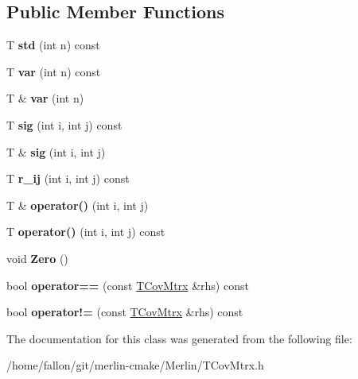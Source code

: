 \subsection*{Public Member Functions}
\begin{DoxyCompactItemize}
\item 
\mbox{\label{classTCovMtrx_ad3204c31a14b50cbf206a4240161e376}} 
T {\bfseries std} (int n) const
\item 
\mbox{\label{classTCovMtrx_a3162fcd988af288c9f18a07e52c3743c}} 
T {\bfseries var} (int n) const
\item 
\mbox{\label{classTCovMtrx_a8b238eeb634fb511693d7f4cda995edf}} 
T \& {\bfseries var} (int n)
\item 
\mbox{\label{classTCovMtrx_a44b617d9ba11fc1065b488c02a5dbfb1}} 
T {\bfseries sig} (int i, int j) const
\item 
\mbox{\label{classTCovMtrx_a432d924792148023a4935b919ef19f37}} 
T \& {\bfseries sig} (int i, int j)
\item 
\mbox{\label{classTCovMtrx_a4e1603c40c49de6267f49b216aba1846}} 
T {\bfseries r\+\_\+ij} (int i, int j) const
\item 
\mbox{\label{classTCovMtrx_a2721b8d49b5ab700cf01771012830eb5}} 
T \& {\bfseries operator()} (int i, int j)
\item 
\mbox{\label{classTCovMtrx_ab142673e5d8a810b726eac33c7f7345a}} 
T {\bfseries operator()} (int i, int j) const
\item 
\mbox{\label{classTCovMtrx_afbbdc33177386cca04fb27975cb5e96a}} 
void {\bfseries Zero} ()
\item 
\mbox{\label{classTCovMtrx_aa300945422c690f188f436ed03355d27}} 
bool {\bfseries operator==} (const \hyperlink{classTCovMtrx}{T\+Cov\+Mtrx} \&rhs) const
\item 
\mbox{\label{classTCovMtrx_a18f5f4e9ba7a4c2bd18d56c87260c2e8}} 
bool {\bfseries operator!=} (const \hyperlink{classTCovMtrx}{T\+Cov\+Mtrx} \&rhs) const
\end{DoxyCompactItemize}


The documentation for this class was generated from the following file\+:\begin{DoxyCompactItemize}
\item 
/home/fallon/git/merlin-\/cmake/\+Merlin/T\+Cov\+Mtrx.\+h\end{DoxyCompactItemize}
